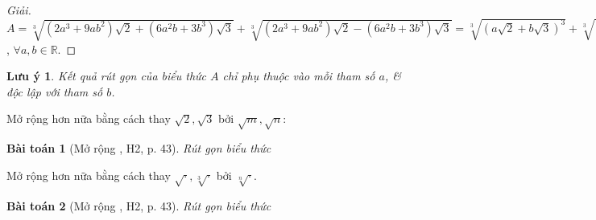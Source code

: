 \documentclass{article}
\numberwithin{equation}{section}
\newtheorem{baitoan}{Bài toán}[section]
\newtheorem{luuy}{Lưu ý}[section]
\begin{document}
\begin{proof}[Giải]
	$A = \sqrt[3]{(2a^3 + 9ab^2)\sqrt{2} + (6a^2b + 3b^3)\sqrt{3}} + \sqrt[3]{(2a^3 + 9ab^2)\sqrt{2} - (6a^2b + 3b^3)\sqrt{3}} = \sqrt[3]{(a\sqrt{2} + b\sqrt{3})^3} + \sqrt[3]{(a\sqrt{2} - b\sqrt{3})^3} = a\sqrt{2} + b\sqrt{3} + a\sqrt{2} - b\sqrt{3} = 2a\sqrt{2}$, $\forall a,b\in\mathbb{R}$.
\end{proof}

\begin{luuy}
	Kết quả rút gọn của biểu thức $A$ chỉ phụ thuộc vào mỗi tham số $a$, \& độc lập với tham số $b$.
\end{luuy}
Mở rộng hơn nữa bằng cách thay $\sqrt{2},\sqrt{3}$ bởi $\sqrt{m},\sqrt{n}$:

\begin{baitoan}[Mở rộng \cite{TL_chuyen_Toan_Giai_Tich_12}, H2, p. 43]
	Rút gọn biểu thức
	
\end{baitoan}
Mở rộng hơn nữa bằng cách thay $\sqrt{\cdot},\sqrt[3]{\cdot}$ bởi $\sqrt[n]{\cdot}$.
\begin{baitoan}[Mở rộng \cite{TL_chuyen_Toan_Giai_Tich_12}, H2, p. 43]
	Rút gọn biểu thức
	
\end{baitoan}


\printbibliography[heading=bibintoc]
	
\end{document}
